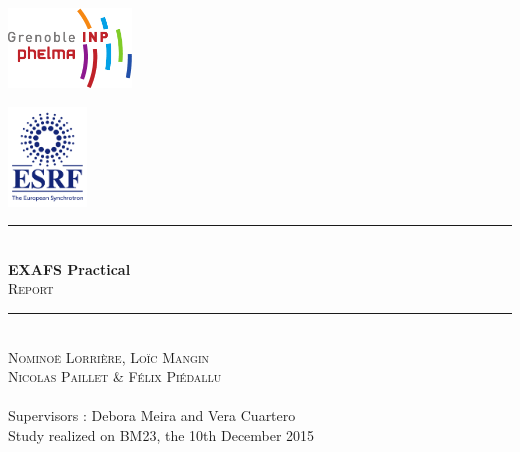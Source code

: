 \begin{titlepage}
    \vspace*{-10px}
    \includegraphics[height=80px]{Images/logo_phelma.pdf}
    \vspace*{-80px}
\begin{flushright}
    \vspace*{-30px}
    \includegraphics[height=100px]{Images/ESRF_logo.jpg}
\end{flushright}

\vspace*{0.5cm}
\begin{center}
\rule{\linewidth}{0.5mm}
    \\[0.4cm]
    {\huge \textbf{EXAFS Practical}}
    \\[0.4cm]
    {\huge \textsc{Report}}
    \\[0.4cm]
\rule{\linewidth}{0.5mm}
\\[1cm]

    \LARGE{\textsc{Nominoë Lorrière, Loïc Mangin\\ Nicolas Paillet \& Félix Piédallu}}
    \\[0.7cm]
    \large{~}%
    \\[1cm]

    \Large{Supervisors : Debora Meira and Vera Cuartero}\\[1cm]

    \large{Study realized on BM23, the 10th December 2015}\\[2cm]


\end{center}
\end{titlepage}

\tableofcontents        %
\newpage
{}  %
